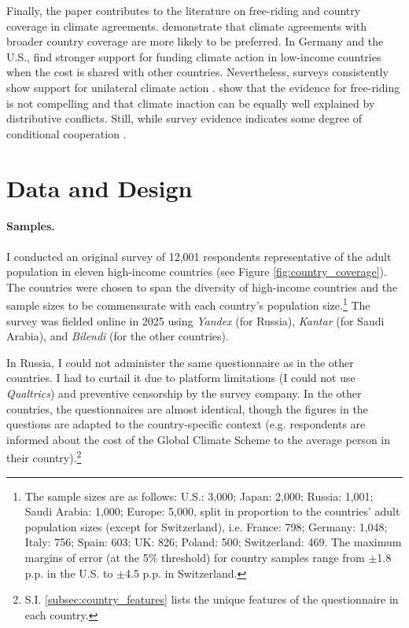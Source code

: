 \documentclass[12pt,english]{article}
\begin{document}
\begin{bibunit}
Finally, the paper contributes to the literature on free-riding and country coverage in climate agreements. \cite{beiser-mcgrath_could_2019} demonstrate that climate agreements with broader country coverage are more likely to be preferred. In Germany and the U.S., \cite{gampfer_obtaining_2014} find stronger support for funding climate action in low-income countries when the cost is shared with other countries. Nevertheless, surveys consistently show support for unilateral climate action \citep{bernauer_how_2015,mcgrath_how_2017}. \cite{aklin_prisoners_2020} show that the evidence for free-riding is not compelling and that climate inaction can be equally well explained by distributive conflicts. Still, while survey evidence indicates some degree of conditional cooperation \citep{carlsson_importance_2025,tam_they_2025}.

\section{Data and Design\label{sec:data}}

\paragraph{Samples.}
I conducted an original survey of 12,001 respondents representative of the adult population in eleven high-income countries (see Figure \ref{fig:country_coverage}). The countries were chosen to span the diversity of high-income countries and the sample sizes to be commensurate with each country's population size.\footnote{The sample sizes are as follows: U.S.: 3,000; Japan: 2,000; Russia: 1,001; Saudi Arabia: 1,000; Europe: 5,000, split in proportion to the countries' adult population sizes (except for Switzerland), i.e. France: 798; Germany: 1,048; Italy: 756; Spain: 603; UK: 826; Poland: 500; Switzerland: 469. The maximum margins of error (at the 5\% threshold) for country samples range from $\pm$1.8 p.p. in the U.S. to $\pm$4.5 p.p. in Switzerland.}
The survey was fielded online in 2025 using \textit{Yandex} (for Russia), \textit{Kantar} (for Saudi Arabia), and \textit{Bilendi} (for the other countries).%

In Russia, I could not administer the same questionnaire as in the other countries. I had to curtail it due to platform limitations (I could not use \textit{Qualtrics}) and preventive censorship by the survey company. In the other countries, the questionnaires are almost identical, though the figures in the questions are adapted to the country-specific context (e.g. respondents are informed about the cost of the Global Climate Scheme to the average person in their country).\footnote{S.I. \ref{subsec:country_features} lists the unique features of the questionnaire in each country.}


\end{bibunit}
\end{document}
